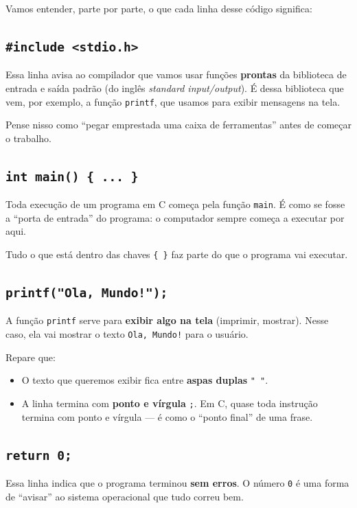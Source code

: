 Vamos entender, parte por parte, o que cada linha desse código significa:

\subsection*{\textcolor{verdeC}{\texttt{\#include <stdio.h>}}}
Essa linha avisa ao compilador que vamos usar funções \textbf{prontas} da biblioteca de entrada e saída padrão (do inglês \textit{standard input/output}). É dessa biblioteca que vem, por exemplo, a função \texttt{printf}, que usamos para exibir mensagens na tela.

Pense nisso como ``pegar emprestada uma caixa de ferramentas'' antes de começar o trabalho.

\subsection*{\textcolor{verdeC}{\texttt{int main() \{ ... \}}}}
Toda execução de um programa em C começa pela função \texttt{main}. É como se fosse a ``porta de entrada'' do programa: o computador sempre começa a executar por aqui.

Tudo o que está dentro das chaves \texttt{\{ \}} faz parte do que o programa vai executar.

\subsection*{\textcolor{verdeC}{\texttt{printf("Ola, Mundo!");}}}
A função \texttt{printf} serve para \textbf{exibir algo na tela} (imprimir, mostrar). Nesse caso, ela vai mostrar o texto \texttt{Ola, Mundo!} para o usuário.

Repare que:
\begin{itemize}
    \item O texto que queremos exibir fica entre \textbf{aspas duplas} \texttt{" "}.
    \item A linha termina com \textbf{ponto e vírgula} \texttt{;}. Em C, quase toda instrução termina com ponto e vírgula --- é como o ``ponto final'' de uma frase.
\end{itemize}

\subsection*{\textcolor{verdeC}{\texttt{return 0;}}}
Essa linha indica que o programa terminou \textbf{sem erros}. O número \texttt{0} é uma forma de ``avisar'' ao sistema operacional que tudo correu bem.

